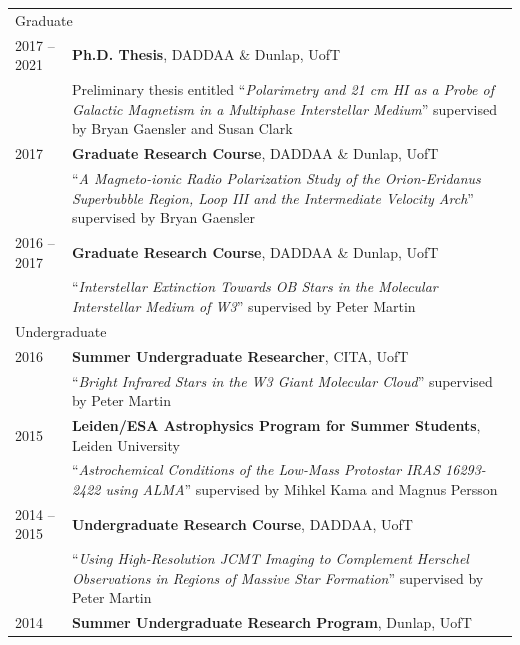 \documentclass[10pt]{res} %
\begin{document}
\begin{resume}
\begin{table}[h!]
\begin{tabularx}{\textwidth}{ @{} p{6.5em} X @{} }
\multicolumn{2}{l}{ \rule{0pt}{3ex} \large \hspace{-12pt} Graduate \dotfill \rule[-1.2ex]{0pt}{0pt}} \\
2017 -- 2021 & \textbf{Ph.D. Thesis}, DADDAA \& Dunlap, UofT \\
                     & Preliminary thesis entitled ``\textit{Polarimetry and 21 cm HI as a Probe of Galactic Magnetism in a Multiphase Interstellar Medium}'' supervised by Bryan Gaensler and Susan Clark \\
2017 & \textbf{Graduate Research Course}, DADDAA \& Dunlap, UofT \\
         & ``\textit{A Magneto-ionic Radio Polarization Study of the Orion-Eridanus Superbubble Region, Loop III and the Intermediate Velocity Arch}'' supervised by Bryan Gaensler \\
2016 -- 2017 & \textbf{Graduate Research Course}, DADDAA \& Dunlap, UofT  \\
                     & ``\textit{Interstellar Extinction Towards OB Stars in the Molecular Interstellar Medium of W3}'' supervised by Peter Martin \\
\multicolumn{2}{l}{ \rule{0pt}{3ex} \large \hspace{-12pt} Undergraduate \dotfill \rule[-1.2ex]{0pt}{0pt}} \\ 
2016 & \textbf{Summer Undergraduate Researcher}, CITA, UofT \\
         & ``\textit{Bright Infrared Stars in the W3 Giant Molecular Cloud}'' supervised by Peter Martin \\
2015 & \textbf{Leiden/ESA Astrophysics Program for Summer Students}, Leiden University \\
         & ``\textit{Astrochemical Conditions of the Low-Mass Protostar IRAS 16293-2422 using ALMA}'' supervised by Mihkel Kama and Magnus Persson \\
2014 -- 2015 & \textbf{Undergraduate Research Course}, DADDAA, UofT \\
                     & ``\textit{Using High-Resolution JCMT Imaging to Complement Herschel Observations in Regions of Massive Star Formation}'' supervised by Peter Martin \\
2014 & \textbf{Summer Undergraduate Research Program}, Dunlap, UofT \\

\end{tabularx}
\end{table}
\end{resume}
\end{document}
